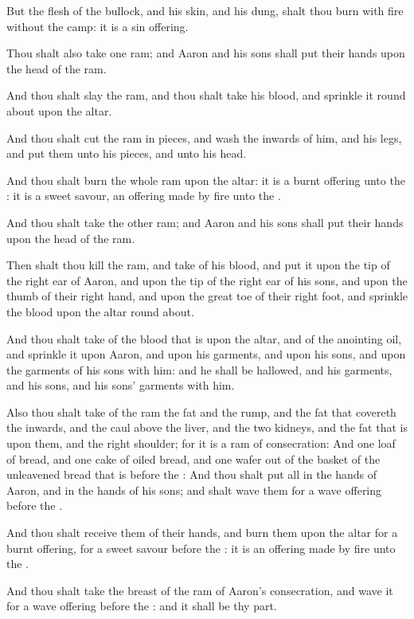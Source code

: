 \Verse But the flesh of the bullock, and his skin, and his dung, shalt thou burn with fire without the camp: it is a sin offering.

\Verse Thou shalt also take one ram; and Aaron and his sons shall put their hands upon the head of the ram.

\Verse And thou shalt slay the ram, and thou shalt take his blood, and sprinkle it round about upon the altar.

\Verse And thou shalt cut the ram in pieces, and wash the inwards of him, and his legs, and put them unto his pieces, and unto his head.

\Verse And thou shalt burn the whole ram upon the altar: it is a burnt offering unto the \LORD: it is a sweet savour, an offering made by fire unto the \LORD.

\Verse And thou shalt take the other ram; and Aaron and his sons shall put their hands upon the head of the ram.

\Verse Then shalt thou kill the ram, and take of his blood, and put it upon the tip of the right ear of Aaron, and upon the tip of the right ear of his sons, and upon the thumb of their right hand, and upon the great toe of their right foot, and sprinkle the blood upon the altar round about.

\Verse And thou shalt take of the blood that is upon the altar, and of the anointing oil, and sprinkle it upon Aaron, and upon his garments, and upon his sons, and upon the garments of his sons with him: and he shall be hallowed, and his garments, and his sons, and his sons' garments with him.

\Verse Also thou shalt take of the ram the fat and the rump, and the fat that covereth the inwards, and the caul above the liver, and the two kidneys, and the fat that is upon them, and the right shoulder; for it is a ram of consecration: \Verse And one loaf of bread, and one cake of oiled bread, and one wafer out of the basket of the unleavened bread that is before the \LORD: \Verse And thou shalt put all in the hands of Aaron, and in the hands of his sons; and shalt wave them for a wave offering before the \LORD.

\Verse And thou shalt receive them of their hands, and burn them upon the altar for a burnt offering, for a sweet savour before the \LORD: it is an offering made by fire unto the \LORD.

\Verse And thou shalt take the breast of the ram of Aaron's consecration, and wave it for a wave offering before the \LORD: and it shall be thy part.


